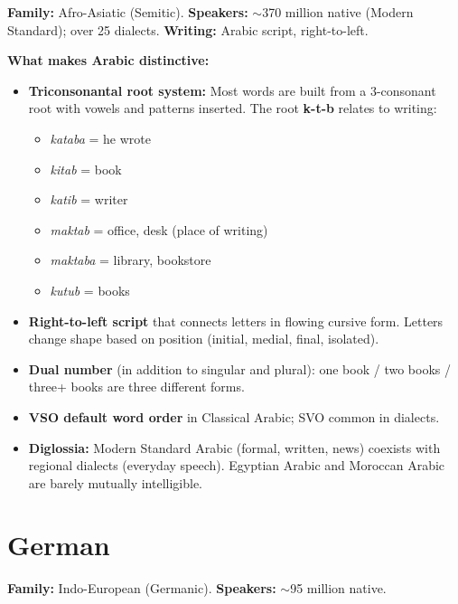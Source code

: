 \documentclass[11pt, letterpaper]{article}
\begin{document}
\textbf{Family:} Afro-Asiatic (Semitic). \textbf{Speakers:} $\sim$370 million native (Modern Standard); over 25 dialects. \textbf{Writing:} Arabic script, right-to-left.

\textbf{What makes Arabic distinctive:}
\begin{itemize}[noitemsep]
  \item \textbf{Triconsonantal root system:} Most words are built from a 3-consonant root with vowels and patterns inserted. The root \textbf{k-t-b} relates to writing:
    \begin{itemize}[noitemsep]
      \item \emph{kataba} = he wrote
      \item \emph{kitab} = book
      \item \emph{katib} = writer
      \item \emph{maktab} = office, desk (place of writing)
      \item \emph{maktaba} = library, bookstore
      \item \emph{kutub} = books
    \end{itemize}
  \item \textbf{Right-to-left script} that connects letters in flowing cursive form. Letters change shape based on position (initial, medial, final, isolated).
  \item \textbf{Dual number} (in addition to singular and plural): one book / two books / three+ books are three different forms.
  \item \textbf{VSO default word order} in Classical Arabic; SVO common in dialects.
  \item \textbf{Diglossia:} Modern Standard Arabic (formal, written, news) coexists with regional dialects (everyday speech). Egyptian Arabic and Moroccan Arabic are barely mutually intelligible.
\end{itemize}

\section*{German}

\textbf{Family:} Indo-European (Germanic). \textbf{Speakers:} $\sim$95 million native.
\end{document}
